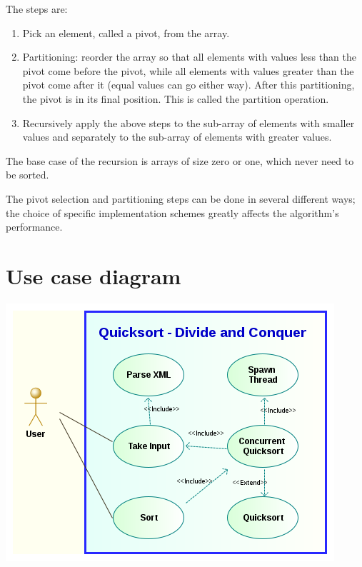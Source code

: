 \documentclass[10pt,a4paper]{article}
\begin{document}
The steps are:
\begin{enumerate}
\item Pick an element, called a pivot, from the array.

\item Partitioning: reorder the array so that all elements with values less than the pivot come before the pivot, while all elements with values greater than the pivot come after it (equal values can go either way). After this partitioning, the pivot is in its final position. This is called the partition operation.

\item Recursively apply the above steps to the sub-array of elements with smaller values and separately to the sub-array of elements with greater values.
\end{enumerate}

The base case of the recursion is arrays of size zero or one, which never need to be sorted.

The pivot selection and partitioning steps can be done in several different ways; the choice of specific implementation schemes greatly affects the algorithm's performance.


\section{Use case diagram}
\includegraphics[scale=0.6]{use_case_diagram.png}
\end{document}
